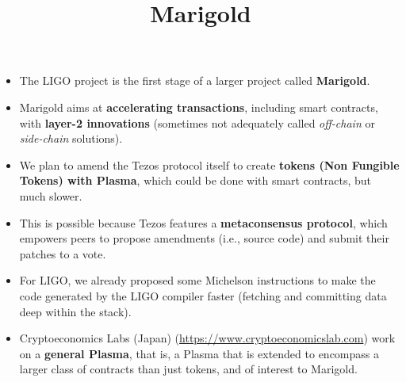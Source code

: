 \documentclass[wide]{slides}
\begin{document}
\begin{slide}
  \title{Marigold}

  \begin{itemize}

    \item The LIGO project is the first stage of a larger project
      called \textbf{Marigold}.

    \item Marigold aims at \textbf{accelerating transactions},
      including smart contracts, with \textbf{layer-2 innovations}
      (sometimes not adequately called \emph{off-chain} or
      \emph{side-chain} solutions).

    \item We plan to amend the Tezos protocol itself to create
      \textbf{tokens (Non Fungible Tokens) with Plasma}, which could
      be done with smart contracts, but much slower.

    \item This is possible because Tezos features a
      \textbf{metaconsensus protocol}, which empowers peers to propose
      amendments (i.e., source code) and submit their patches to a
      vote.

    \item For LIGO, we already proposed some Michelson instructions to
      make the code generated by the LIGO compiler faster (fetching
      and committing data deep within the stack).

    \item Cryptoeconomics Labs (Japan)
      (\url{https://www.cryptoeconomicslab.com}) work on a
      \textbf{general Plasma}, that is, a Plasma that is extended to
      encompass a larger class of contracts than just tokens, and of
      interest to Marigold.

  \end{itemize}

\end{slide}
\end{document}
